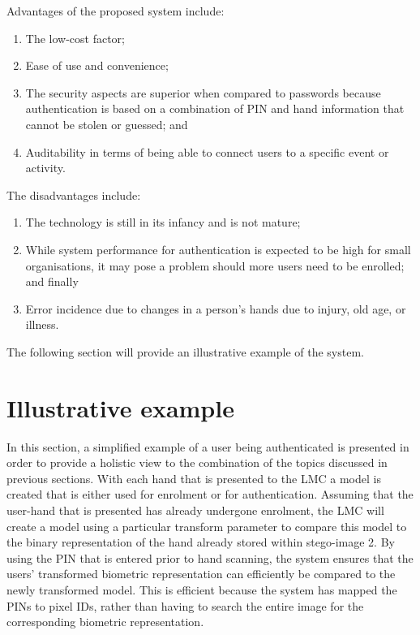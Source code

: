 Advantages of the proposed system include:
    \begin{enumerate}[label=\roman*.]
        \item The low-cost factor; 
        \item Ease of use and convenience;
        \item The security aspects are superior when compared to passwords because authentication is based on a combination of PIN and hand information that cannot be stolen or guessed; and
        \item Auditability in terms of being able to connect users to a specific event or activity.
    \end{enumerate}
	
The disadvantages include: 
    \begin{enumerate}[label=\roman*.]
        \item The technology is still in its infancy and is not mature;
        \item While system performance for authentication is expected to be high for small organisations, it may pose a problem should more users need to be enrolled; and finally
        \item Error incidence due to changes in a person’s hands due to injury, old age, or illness.
    \end{enumerate}

The following section will provide an illustrative example of the system.

\section{Illustrative example}

In this section, a simplified example of a user being authenticated is presented in order to provide a holistic view to the combination of the topics discussed in previous sections.
With each hand that is presented to the LMC a model is created that is either used for enrolment or for authentication. Assuming that the user-hand that is presented has already undergone enrolment, the LMC will create a model using a particular transform parameter to compare this model to the binary representation of the hand already stored within stego-image 2. By using the PIN that is entered prior to hand scanning, the system ensures that the users’ transformed biometric representation can efficiently be compared to the newly transformed model. This is efficient because the system has mapped the PINs to pixel IDs, rather than having to search the entire image for the corresponding biometric representation.

